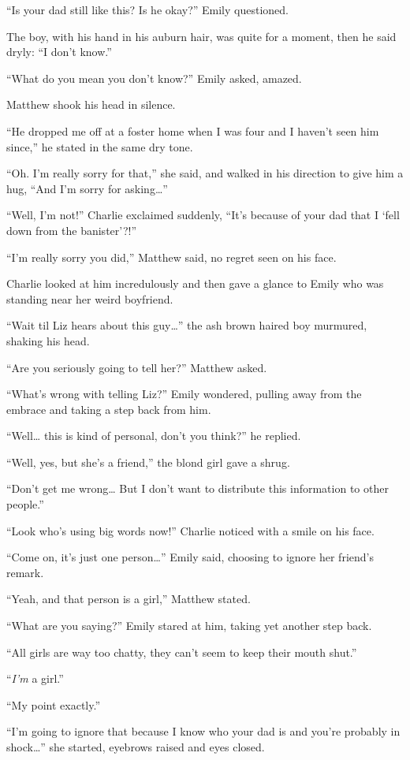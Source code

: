 “Is your dad still like this? Is he okay?” Emily questioned.

The boy, with his hand in his auburn hair, was quite for a moment, then he said dryly: “I don't know.”

“What do you mean you don't know?” Emily asked, amazed.

Matthew shook his head in silence.

“He dropped me off at a foster home when I was four and I haven't seen him since,” he stated in the same dry tone.

“Oh. I'm really sorry for that,” she said, and walked in his direction to give him a hug, “And I'm sorry for asking…”

“Well, I'm not!” Charlie exclaimed suddenly, “It's because of your dad that I ‘fell down from the banister'?!”

“I'm really sorry you did,” Matthew said, no regret seen on his face.

Charlie looked at him incredulously and then gave a glance to Emily who was standing near her weird boyfriend.

“Wait til Liz hears about this guy…” the ash brown haired boy murmured, shaking his head.

“Are you seriously going to tell her?” Matthew asked.

“What's wrong with telling Liz?” Emily wondered, pulling away from the embrace and taking a step back from him.

“Well… this is kind of personal, don't you think?” he replied.

“Well, yes, but she's a friend,” the blond girl gave a shrug.

“Don't get me wrong… But I don't want to distribute this information to other people.”

“Look who's using big words now!” Charlie noticed with a smile on his face.

“Come on, it's just one person…” Emily said, choosing to ignore her friend's remark.

“Yeah, and that person is a girl,” Matthew stated.

“What are you saying?” Emily stared at him, taking yet another step back.

“All girls are way too chatty, they can't seem to keep their mouth shut.”

“\textit{I'm} a girl.”

“My point exactly.”

“I'm going to ignore that because I know who your dad is and you're probably in shock…” she started, eyebrows raised and eyes closed.

